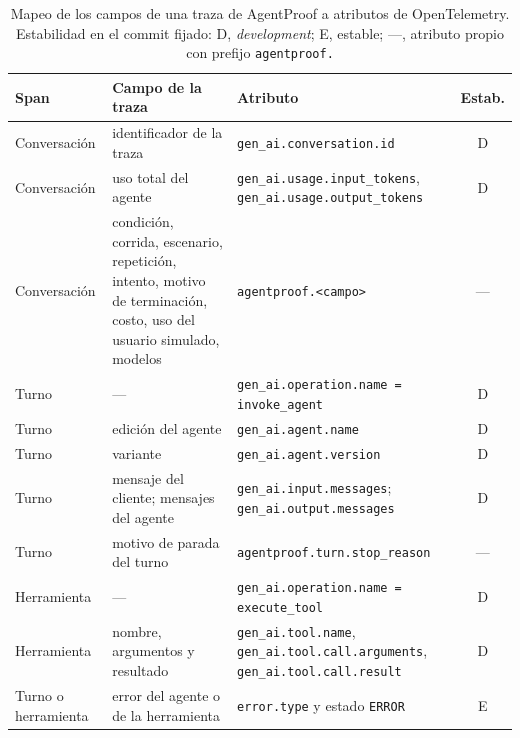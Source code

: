\begin{table}[H]
  \caption{Mapeo de los campos de una traza de AgentProof a atributos de OpenTelemetry. Estabilidad en el commit fijado: D, \emph{development}; E, estable; ---, atributo propio con prefijo \texttt{agentproof.}}
  \label{tab:otel}
  \small
  \begin{tabular}{|>{\raggedright\arraybackslash}p{0.85in}|>{\raggedright\arraybackslash}p{1.95in}|>{\raggedright\arraybackslash}p{2.35in}|c|}
    \hline
    \textbf{Span} & \textbf{Campo de la traza} & \textbf{Atributo} & \textbf{Estab.} \\ \hline
    Conversación & identificador de la traza & \texttt{gen\_ai.conversation.id} & D \\ \hline
    Conversación & uso total del agente & \texttt{gen\_ai.usage.input\_tokens}, \texttt{gen\_ai.usage.output\_tokens} & D \\ \hline
    Conversación & condición, corrida, escenario, repetición, intento, motivo de terminación, costo, uso del usuario simulado, modelos & \texttt{agentproof.<campo>} & --- \\ \hline
    Turno & --- & \texttt{gen\_ai.operation.name = invoke\_agent} & D \\ \hline
    Turno & edición del agente & \texttt{gen\_ai.agent.name} & D \\ \hline
    Turno & variante & \texttt{gen\_ai.agent.version} & D \\ \hline
    Turno & mensaje del cliente; mensajes del agente & \texttt{gen\_ai.input.messages}; \texttt{gen\_ai.output.messages} & D \\ \hline
    Turno & motivo de parada del turno & \texttt{agentproof.turn.stop\_reason} & --- \\ \hline
    Herramienta & --- & \texttt{gen\_ai.operation.name = execute\_tool} & D \\ \hline
    Herramienta & nombre, argumentos y resultado & \texttt{gen\_ai.tool.name}, \texttt{gen\_ai.tool.call.arguments}, \texttt{gen\_ai.tool.call.result} & D \\ \hline
    Turno o herramienta & error del agente o de la herramienta & \texttt{error.type} y estado \texttt{ERROR} & E \\ \hline
  \end{tabular}
\end{table}

\endgroup
